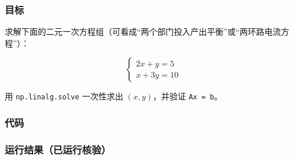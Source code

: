 \subsubsection{目标}\label{ux76eeux6807-6}

求解下面的二元一次方程组（可看成``两个部门投入产出平衡''或``两环路电流方程''）：

\[
\begin{cases} 2x + y = 5 \\ x + 3y = 10 \end{cases}
\]

用 \texttt{np.linalg.solve} 一次性求出 \((x, y)\)，并验证
\texttt{Ax\ =\ b}。

\subsubsection{代码}\label{ux4ee3ux7801-6}

\begin{Shaded}
\begin{Highlighting}[]
\OperatorTok{=}\OperatorTok{=}\NormalTok{)}

\OperatorTok{=}\NormalTok{ np.array([[}\NormalTok{, }\NormalTok{],}
\NormalTok{              [}\NormalTok{, }\NormalTok{]])}
\OperatorTok{=}\NormalTok{ np.array([}\NormalTok{, }\NormalTok{])}

\OperatorTok{=}
\NormalTok{(}
\NormalTok{(}
\NormalTok{(}
\end{Highlighting}
\end{Shaded}

\subsubsection{运行结果（已运行核验）}\label{ux8fd0ux884cux7ed3ux679cux5df2ux8fd0ux884cux6838ux9a8c-6}

\begin{Shaded}
\begin{Highlighting}[]
\end{Highlighting}
\end{Shaded}


